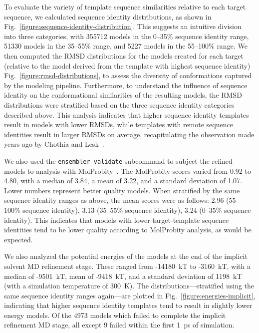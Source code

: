 \documentclass[aps,pre,twocolumn,nofootinbib,superscriptaddress,linenumbers]{revtex4-1}
\begin{document}
To evaluate the variety of template sequence similarities relative to each target sequence, we calculated sequence identity distributions, as shown in Fig.~\ref{figure:sequence-identity-distribution}.
This suggests an intuitive division into three categories, with \num{355712} models in the 0--35\% sequence identity range, \num{51330} models in the 35--55\% range, and \num{5227} models in the 55--100\% range.
We then computed the RMSD distributions for the models created for each target (relative to the model derived from the template with highest sequence identity) Fig.~\ref{figure:rmsd-distributions}, to assess the diversity of conformations captured by the modeling pipeline.
Furthermore, to understand the influence of sequence identity on the conformational similarities of the resulting models, the RMSD distributions were stratified based on the three sequence identity categories described above.
\color{red}
This analysis indicates that higher sequence identity templates result in models with lower RMSDs, while templates with remote sequence identities result in larger RMSDs on average, recapitulating the observation made years ago by Chothia and Lesk~\cite{chothia-lesk:embo-j:1986:rmsd-sequence-identity-relation}.

\color{red}
We also used the {\tt ensembler validate} subcommand to subject the refined models to analysis with MolProbity~\cite{molprobity:2007,molprobity:2010}.
The MolProbity scores varied from 0.92 to 4.80, with a median of 3.84, a mean of 3.22, and a standard deviation of 1.07.
Lower numbers represent better quality models.
When stratified by the same sequence identity ranges as above, the mean scores were as follows: 2.96 (55--100\% sequence identity), 3.13 (35--55\% sequence identity), 3.24 (0--35\% sequence identity).
This indicates that models with lower target-template sequence identities tend to be lower quality according to MolProbity analysis, as would be expected.

\color{black}
We also analyzed the potential energies of the models at the end of the implicit solvent MD refinement stage.
These ranged from -14180~kT to -3160~kT, with a median of -9501~kT, mean of -9418~kT, and a standard deviation of 1198~kT (with a simulation temperature of 300~K).
The distributions---stratified using the same sequence identity ranges again---are plotted in Fig.~\ref{figure:energies-implicit}, indicating that higher sequence identity templates tend to result in slightly lower energy models.
Of the \num{4973} models which failed to complete the implicit refinement MD stage, all except 9 failed within the first 1~ps of simulation.
\end{document}

